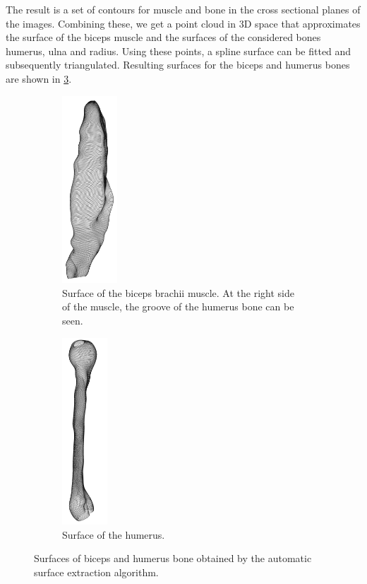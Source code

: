 The result is a set of contours for muscle and bone in the cross sectional planes of the images. Combining these, we get a point cloud in 3D space that approximates the surface of the biceps muscle and the surfaces of the considered bones humerus, ulna and radius. Using these points, a spline surface can be fitted and subsequently triangulated. Resulting surfaces for the biceps and humerus bones are shown in \cref{fig:extraction_result}.
%
\begin{figure}%
  \centering%
  \begin{subfigure}[t]{0.48\textwidth}%
    \centering%
    \includegraphics[height=7cm]{images/fiber_creation/extraction_biceps.png}%
    \caption{Surface of the biceps brachii muscle. At the right side of the muscle, the groove of the humerus bone can be seen.}%
    \label{fig:extraction_result_biceps}%
  \end{subfigure}
  \begin{subfigure}[t]{0.48\textwidth}%
    \centering%
    \includegraphics[height=7cm]{images/fiber_creation/extraction_humerus00.png}%
    \caption{Surface of the humerus.}%
    \label{fig:extraction_result_humerus}%
  \end{subfigure}    
  \caption{Surfaces of biceps and humerus bone obtained by the automatic surface extraction algorithm.}%
  \label{fig:extraction_result}%
\end{figure}%

